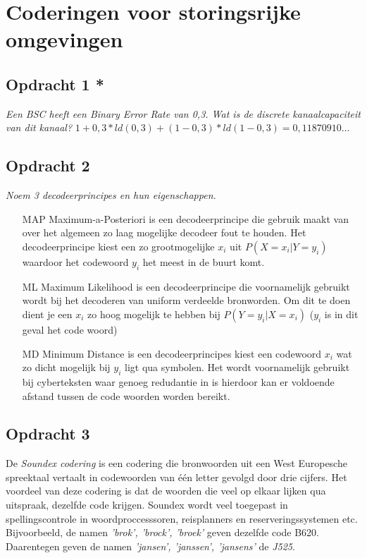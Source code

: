 \chapter{Coderingen voor storingsrijke omgevingen}

\section{Opdracht 1 *}
\emph{Een BSC heeft een \emph{Binary Error Rate} van 0,3. Wat is de discrete kanaalcapaciteit van dit kanaal?}
$1+0,3*ld(0,3)+(1-0,3)*ld(1-0,3)=0,11870910\ldots$

\section{Opdracht 2}
\emph{Noem 3 decodeerprincipes en hun eigenschappen.}\\

\begin{itemize}
\item[MAP] Maximum-a-Posteriori is een decodeerprincipe die gebruik maakt van over het algemeen zo laag mogelijke decodeer fout te houden. Het decodeerprincipe kiest een zo grootmogelijke $x_i$ uit $P(X=x_i|Y=y_i)$ waardoor het codewoord $y_i$ het meest in de buurt komt.
\item[ML] Maximum Likelihood is een decodeerprincipe die voornamelijk gebruikt wordt bij het decoderen van uniform verdeelde bronworden. Om dit te doen dient je een $x_i$ zo hoog mogelijk te hebben bij $P(Y=y_i|X=x_i)$ ($y_i$ is in dit geval het code woord)
\item[MD] Minimum Distance is een decodeerprincipes kiest een codewoord $x_i$ wat zo dicht mogelijk bij $y_i$ ligt qua symbolen. Het wordt voornamelijk gebruikt bij cyberteksten waar genoeg redudantie in is hierdoor kan er voldoende afstand tussen de code woorden worden bereikt.
\end{itemize}

\section{Opdracht 3}
De \emph{Soundex codering} is een codering die bronwoorden uit een West Europesche spreektaal vertaalt in codewoorden van \'{e}\'{e}n letter gevolgd door drie cijfers. Het voordeel van deze codering is dat de woorden die veel op elkaar lijken qua uitspraak, dezelfde code krijgen. Soundex wordt veel toegepast in spellingscontrole in woordproccesssoren, reisplanners en reserveringssystemen etc. Bijvoorbeeld, de namen \emph{'brok', 'brock', 'broek'} geven dezelfde code B620. Daarentegen geven de namen \emph{'jansen', 'janssen', 'jansens'} de \emph{J525}.

